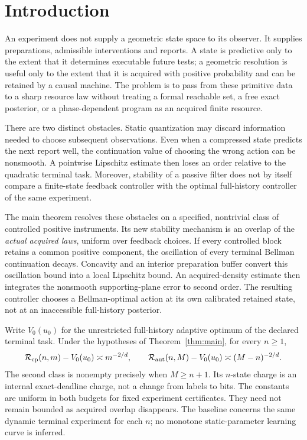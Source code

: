 \section{Introduction}\label{sec:intro}
An experiment does not supply a geometric state space to its observer. It supplies preparations, admissible interventions and reports. A state is predictive only to the extent that it determines executable future tests; a geometric resolution is useful only to the extent that it is acquired with positive probability and can be retained by a causal machine. The problem is to pass from these primitive data to a sharp resource law without treating a formal reachable set, a free exact posterior, or a phase-dependent program as an acquired finite resource.

There are two distinct obstacles. Static quantization may discard information needed to choose subsequent observations. Even when a compressed state predicts the next report well, the continuation value of choosing the wrong action can be nonsmooth. A pointwise Lipschitz estimate then loses an order relative to the quadratic terminal task. Moreover, stability of a passive filter does not by itself compare a finite-state feedback controller with the optimal full-history controller of the same experiment.

The main theorem resolves these obstacles on a specified, nontrivial class of controlled positive instruments. Its new stability mechanism is an overlap of the \emph{actual acquired laws}, uniform over feedback choices. If every controlled block retains a common positive component, the oscillation of every terminal Bellman continuation decays. Concavity and an interior preparation buffer convert this oscillation bound into a local Lipschitz bound. An acquired-density estimate then integrates the nonsmooth supporting-plane error to second order. The resulting controller chooses a Bellman-optimal action at its own calibrated retained state, not at an inaccessible full-history posterior.

Write $V_0(u_0)$ for the unrestricted full-history adaptive optimum of the declared terminal task. Under the hypotheses of Theorem~\ref{thm:main}, for every $n\ge1$,
\begin{equation}\label{eq:intro-law}
 \mathcal R_{\rm cp}(n,m)-V_0(u_0)\asymp m^{-2/d},\qquad
 \mathcal R_{\rm aut}(n,M)-V_0(u_0)\asymp(M-n)^{-2/d}.
\end{equation}
The second class is nonempty precisely when $M\ge n+1$. Its $n$-state charge is an internal exact-deadline charge, not a change from labels to bits. The constants are uniform in both budgets for fixed experiment certificates. They need not remain bounded as acquired overlap disappears. The baseline concerns the same dynamic terminal experiment for each $n$; no monotone static-parameter learning curve is inferred.

